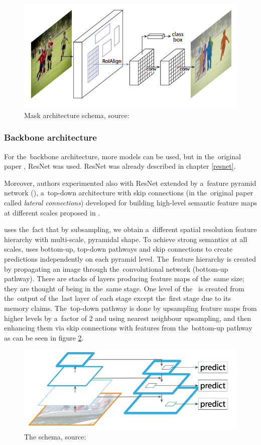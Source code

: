 \begin{figure}[H]
   \centering
	\includegraphics[width=0.4\linewidth]{./pictures/maskrcnn.png}
	\caption[Mask R-CNN architecture]{Mask  architecture schema, source: 
\cite{mask-rcnn}}
      \label{fig:mask-rcnn}
\end{figure}

\subsubsection{Backbone architecture}
\label{backbone}

For the~backbone architecture, more models can be used, but in the~original 
paper \cite{mask-rcnn}, ResNet was used. ResNet was already described in chapter 
\ref{resnet}.

Moreover, authors experimented also with ResNet extended by a~feature pyramid 
network (), a~top-down architecture with skip connections (in
the~original paper called \textit{lateral connections}) developed for building 
high-level semantic feature maps at different scales proposed in \cite{fpn}.

 uses the~fact that by subsampling, we obtain a~different spatial 
resolution feature hierarchy with multi-scale, pyramidal shape. To achieve 
strong semantics at all scales,  uses bottom-up, top-down pathways and 
skip connections to create predictions independently on each pyramid level.
The~feature hierarchy is created by propagating an image through the~convolutional 
network (bottom-up pathway). There are stacks of layers producing feature maps 
of the~same size; they are thought of being in the~same stage. One level of
the~ is created from the~output of the~last layer of each stage except
the~first stage due to its memory claims. The~top-down pathway is done by upsampling 
feature maps from higher levels by a~factor of 2 and using nearest neighbour 
upsampling, and then enhancing them via skip connections with features from
the~bottom-up pathway as can be seen in figure \ref{fig:fpn}.

\begin{figure}[H]
   \centering
	\includegraphics[width=0.4\linewidth]{./pictures/top-down.png}
	\caption[Feature pyramid network]{The  schema, source: \cite{fpn}}
      \label{fig:fpn}
\end{figure}

